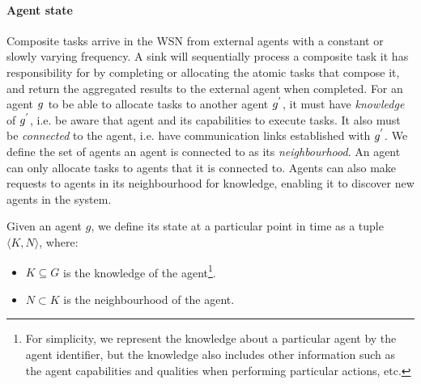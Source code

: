 \paragraph{Agent state}

Composite tasks arrive in the WSN from external agents with a constant or slowly varying frequency. A sink will sequentially process a composite task it has responsibility for by completing or allocating the atomic tasks that compose it, and return the aggregated results to the external agent when completed. For an agent $g_{}^{}$ to be able to allocate tasks to another agent $g_{}^{'}$, it must have \textit{knowledge} of $g_{}^{'}$, i.e. be aware that agent and its capabilities to execute tasks. It also must be \textit{connected} to the agent, i.e. have communication links established with $g_{}^{'}$. We define the set of agents an agent is connected to as its \textit{neighbourhood}. An agent can only allocate tasks to agents that it is connected to. Agents can also make requests to agents in its neighbourhood for knowledge, enabling it to discover new agents in the system.
 
\begin{definition}
	\label{def:agent-state}
	Given an agent $g$, we define its state at a particular point in time as a tuple $\langle K, N\rangle$, where:
	\begin{itemize}
		\item $K\subseteq G$ is the knowledge of the agent\footnote{For simplicity, we represent the knowledge about a particular agent by the agent identifier, but the knowledge also includes other information such as the agent capabilities and qualities when performing particular actions, etc. }.
		\item $N\subset K$ is the neighbourhood of the agent.
	\end{itemize}
\end{definition}


